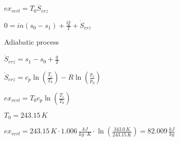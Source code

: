 \( ex_{verl} = T_0 \dot{S}_{erz} \)  

\( 0 = in (s_0 - s_1) + \frac{\dot{Q}}{T} + \dot{S}_{erz} \)  

Adiabatic process  

\( \dot{S}_{erz} = s_1 - s_0 + \frac{\dot{q}}{T} \)  

\( \dot{S}_{erz} = c_p \ln \left( \frac{T_c}{T_0} \right) - R \ln \left( \frac{p_c}{p_0} \right) \)  

\( ex_{verl} = T_0 c_p \ln \left( \frac{T_c}{T_0} \right) \)  

\( T_0 = 243.15 \, K \)  

\( ex_{verl} = 243.15 \, K \cdot 1.006 \, \frac{kJ}{kg \cdot K} \cdot \ln \left( \frac{343.0 \, K}{243.15 \, K} \right) = 82.009 \, \frac{kJ}{kg} \)